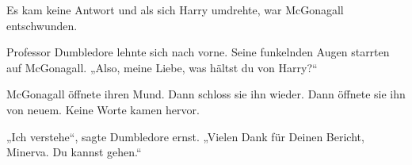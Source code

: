 Es kam keine Antwort und als sich Harry umdrehte, war McGonagall entschwunden.


Professor Dumbledore lehnte sich nach vorne. Seine funkelnden Augen starrten auf McGonagall.
„Also, meine Liebe, was hältst du von Harry?“

McGonagall öffnete ihren Mund. Dann schloss sie ihn wieder. Dann öffnete sie ihn von neuem. Keine Worte kamen hervor.

„Ich verstehe“, sagte Dumbledore ernst.
„Vielen Dank für Deinen Bericht, Minerva. Du kannst gehen.“

